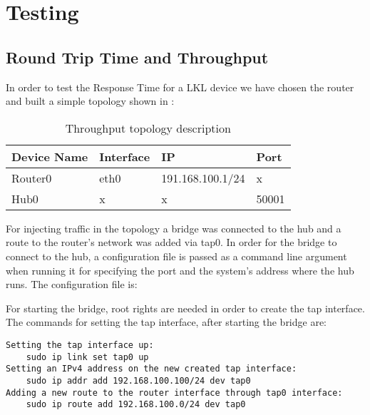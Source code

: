 \chapter{Testing}
\label{ch-testing}

\section{Round Trip Time and Throughput}
\label{sec:rt-troughput}

In order to test the Response Time for a LKL device we have chosen the router and built a simple topology shown in :
\begin{center}
  \begin{table}[htb]
  \begin{center}
  \begin{tabular}{| l | l | l | l |}
    \hline
      Device Name & Interface & IP & Port \\ \hline
      Router0 & eth0 & 191.168.100.1/24 & x \\ \hline
      Hub0 & x & x & 50001\\ 
    \hline
  \end{tabular}
  \end{center}
  \caption{Throughput topology description}
  \label{table:resp-time}
  \end{table}
\end{center}


For injecting traffic in the topology a bridge was connected to the hub and a route to the router's network 
was added via tap0. In order for the bridge to connect to the hub, a configuration file is passed as a command 
line argument when running it for specifying the port and the system's address where the hub runs.
The  configuration file is: 
\lstset{language=TeX, caption=Bridge configuration file}

For starting the bridge, root rights are needed in order to create the tap interface.
The commands for setting the tap interface, after starting the bridge are:
\lstset{language=TeX,caption=Commands for configuring the tap interface,label=test-bridge-config}
\begin{lstlisting}
Setting the tap interface up: 
	sudo ip link set tap0 up
Setting an IPv4 address on the new created tap interface: 
	sudo ip addr add 192.168.100.100/24 dev tap0
Adding a new route to the router interface through tap0 interface: 
	sudo ip route add 192.168.100.0/24 dev tap0
\end{lstlisting}

